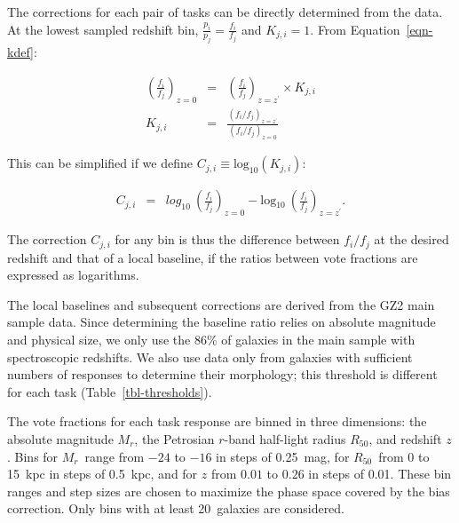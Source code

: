\documentclass[useAMS,usenatbib]{mn2e}
\newcommand{\mr}{$M_r$}
\newcommand{\rfifty}{$R_{50}$}
\newcommand{\redshift}{$z$}
\begin{document}
The corrections for each pair of tasks can be directly determined from the data. At the lowest sampled redshift bin, $\frac{p_i}{p_j} = \frac{f_i}{f_j}$ and $K_{j,i}=1$. From Equation~\ref{eqn-kdef}:

\begin{eqnarray}
\left(\frac{f_i}{f_j}\right)_{z=0} &=& \left(\frac{f_i}{f_j}\right)_{z=z^\prime}\times K_{j,i} \\
K_{j,i} &=& \frac{\left(f_i/f_j\right)_{z=z^\prime} }{ \left(f_i/f_j\right)_{z=0}}
\label{eqnarray-adjprob3}
\end{eqnarray}

\noindent This can be simplified if we define $C_{j,i}\equiv\text{log}_{10}(K_{j,i})$:

\begin{eqnarray}
C_{j,i} &=& \text{$log_{10}$}~\left(\frac{f_i}{f_j}\right)_{z=0} - \text{log$_{10}$}~\left(\frac{f_i}{f_j}\right)_{z=z^\prime}.
\label{eqnarray-adjprob4}
\end{eqnarray}

\noindent The correction $C_{j,i}$ for any bin is thus the difference between $f_i/f_j$ at the desired redshift and that of a local baseline, if the ratios between vote fractions are expressed as logarithms.  

The local baselines and subsequent corrections are derived from the GZ2 main sample data. Since determining the baseline ratio relies on absolute magnitude and physical size, we only use the 86\% of galaxies in the main sample with spectroscopic redshifts. We also use data only from galaxies with sufficient numbers of responses to determine their morphology; this threshold is different for each task (Table~\ref{tbl-thresholds}).  

The vote fractions for each task response are binned in three dimensions: the absolute magnitude \mr, the Petrosian $r$-band half-light radius \rfifty, and redshift $z$. Bins for \mr~range from $-24$ to $-16$ in steps of 0.25~mag, for \rfifty~from 0 to 15~kpc in steps of 0.5~kpc, and for $z$ from $0.01$ to $0.26$ in steps of 0.01. These bin ranges and step sizes are chosen to maximize the phase space covered by the bias correction. Only bins with at least 20~galaxies are considered. %
\end{document}
